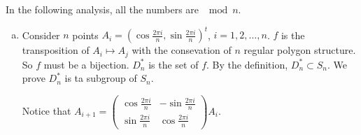 \begin{answer}
    In the following analysis, all the numbers are $\mod n$.
    \begin{enumerate}[(a)]
        \item Consider $n$ points $A_{i}=(\cos \frac{2\pi i}{n},\sin \frac{2\pi i}{n})^{t}$, $i=1,2,\dots,n$. $f$ is the transposition of $A_{i}\mapsto A_{j}$ with the consevation of $n$ regular polygon structure. So $f$ must be a bijection. $D_{n}^{*}$ is the set of $f$. By the definition, $D_{n}^{*}\subset S_{n}$. We prove $D_{n}^{*}$ is ta subgroup of $S_{n}$.
        
        Notice that $A_{i+1}=\begin{pmatrix}
            \cos \frac{2\pi i}{n}&-\sin\frac{2\pi i}{n}\\\sin\frac{2\pi i}{n}&\cos \frac{2\pi i}{n}
        \end{pmatrix}A_{i}$.
        

\end{enumerate}
\end{answer}
